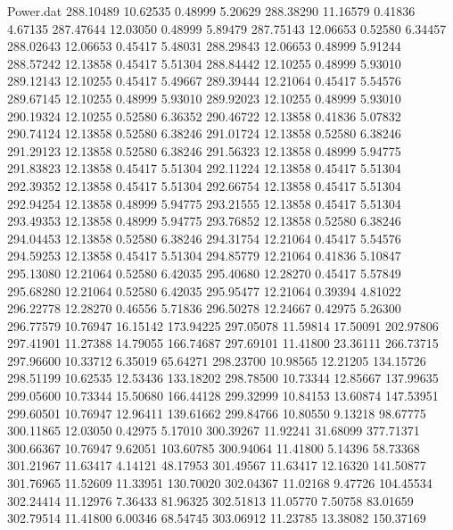 \begin{filecontents}{Power.dat}
 288.10489   10.62535    0.48999    5.20629
 288.38290   11.16579    0.41836    4.67135
 287.47644   12.03050    0.48999    5.89479
 287.75143   12.06653    0.52580    6.34457
 288.02643   12.06653    0.45417    5.48031
 288.29843   12.06653    0.48999    5.91244
 288.57242   12.13858    0.45417    5.51304
 288.84442   12.10255    0.48999    5.93010
 289.12143   12.10255    0.45417    5.49667
 289.39444   12.21064    0.45417    5.54576
 289.67145   12.10255    0.48999    5.93010
 289.92023   12.10255    0.48999    5.93010
 290.19324   12.10255    0.52580    6.36352
 290.46722   12.13858    0.41836    5.07832
 290.74124   12.13858    0.52580    6.38246
 291.01724   12.13858    0.52580    6.38246
 291.29123   12.13858    0.52580    6.38246
 291.56323   12.13858    0.48999    5.94775
 291.83823   12.13858    0.45417    5.51304
 292.11224   12.13858    0.45417    5.51304
 292.39352   12.13858    0.45417    5.51304
 292.66754   12.13858    0.45417    5.51304
 292.94254   12.13858    0.48999    5.94775
 293.21555   12.13858    0.45417    5.51304
 293.49353   12.13858    0.48999    5.94775
 293.76852   12.13858    0.52580    6.38246
 294.04453   12.13858    0.52580    6.38246
 294.31754   12.21064    0.45417    5.54576
 294.59253   12.13858    0.45417    5.51304
 294.85779   12.21064    0.41836    5.10847
 295.13080   12.21064    0.52580    6.42035
 295.40680   12.28270    0.45417    5.57849
 295.68280   12.21064    0.52580    6.42035
 295.95477   12.21064    0.39394    4.81022
 296.22778   12.28270    0.46556    5.71836
 296.50278   12.24667    0.42975    5.26300
 296.77579   10.76947   16.15142  173.94225
 297.05078   11.59814   17.50091  202.97806
 297.41901   11.27388   14.79055  166.74687
 297.69101   11.41800   23.36111  266.73715
 297.96600   10.33712    6.35019   65.64271
 298.23700   10.98565   12.21205  134.15726
 298.51199   10.62535   12.53436  133.18202
 298.78500   10.73344   12.85667  137.99635
 299.05600   10.73344   15.50680  166.44128
 299.32999   10.84153   13.60874  147.53951
 299.60501   10.76947   12.96411  139.61662
 299.84766   10.80550    9.13218   98.67775
 300.11865   12.03050    0.42975    5.17010
 300.39267   11.92241   31.68099  377.71371
 300.66367   10.76947    9.62051  103.60785
 300.94064   11.41800    5.14396   58.73368
 301.21967   11.63417    4.14121   48.17953
 301.49567   11.63417   12.16320  141.50877
 301.76965   11.52609   11.33951  130.70020
 302.04367   11.02168    9.47726  104.45534
 302.24414   11.12976    7.36433   81.96325
 302.51813   11.05770    7.50758   83.01659
 302.79514   11.41800    6.00346   68.54745
 303.06912   11.23785   13.38082  150.37169

\end{filecontents}
